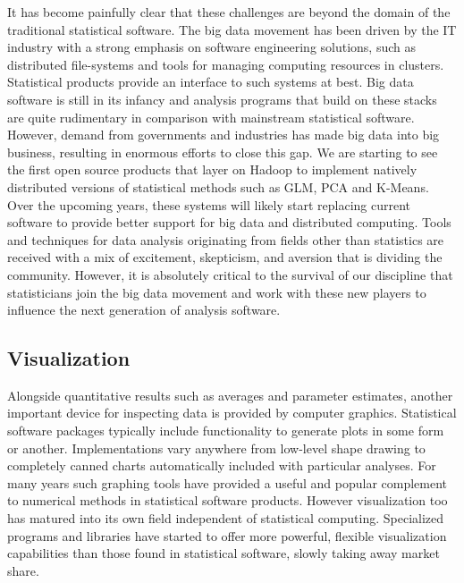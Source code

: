 It has become painfully clear that these challenges are beyond the domain of the traditional statistical software. The big data movement has been driven by the IT industry with a strong emphasis on software engineering solutions, such as distributed file-systems and tools for managing computing resources in clusters. Statistical products provide an interface to such systems at best. Big data software is still in its infancy and analysis programs that build on these stacks are quite rudimentary in comparison with mainstream statistical software. However, demand from governments and industries has made big data into big business, resulting in enormous efforts to close this gap. We are starting to see the first open source products 
that layer on Hadoop to implement natively distributed versions of statistical methods such as GLM, PCA and K-Means. Over the upcoming years, these systems will likely start replacing current software to provide better support for big data and distributed computing. 
Tools and techniques for data analysis originating from fields other than statistics are received with a mix of excitement, skepticism, and aversion that is dividing the community. However, it is absolutely critical to the survival of our discipline that statisticians join the big data movement and work with these new players to influence the next generation of analysis software.


\subsection{Visualization}

Alongside quantitative results such as averages and parameter estimates, another important device for inspecting data is provided by computer graphics. Statistical software packages typically include functionality to generate plots in some form or another. Implementations vary anywhere from low-level shape drawing to completely canned charts automatically included with particular analyses. For many years such graphing tools have provided a useful and popular complement to numerical methods in statistical software products. However visualization too has matured into its own field independent of statistical computing. Specialized programs and libraries have started to offer more powerful, flexible visualization capabilities than those found in statistical software, slowly taking away market share. 

